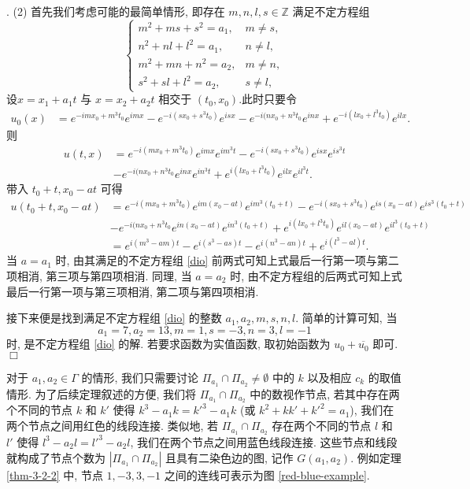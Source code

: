 \documentclass[master]{cugthesis}
\newcommand\Z{\ensuremath{\mathbb{Z}}}
\newenvironment{proof}{{\noindent\itshape 证明}.}{\hfill $\Box$\par}
\begin{document}
\begin{proof}
(2) 首先我们考虑可能的最简单情形, 即存在 $m,n,l,s\in \Z$ 满足不定方程组 
\begin{equation}\label{dio}
    \left\lbrace\begin{array}{ll}
        m^2+ms+s^2=a_1, & m\neq s, \\
        n^2+nl+l^2=a_1, & n\neq l,\\
        m^2+mn+n^2=a_2, & m\neq n,\\
        s^2+sl+l^2=a_2, & s\neq l,
    \end{array}\right.
\end{equation}
 设$x=x_1+a_1 t$ 与 $x=x_2+a_2t$ 相交于 $(t_0,x_0)$.此时只要令
\begin{align*}
    u_0(x) &= e^{-imx_0+m^3t_0}e^{imx}-e^{-i(sx_0+s^3t_0)}e^{isx}-e^{-i(nx_0+n^3t_0}e^{inx}+e^{-i(lx_0+l^3t_0)}e^{ilx}.
\end{align*}
则
\begin{align*}
    u(t,x) &=e^{-i(mx_0+m^3t_0)}e^{imx}e^{im^3t}-e^{-i(sx_0+s^3t_0)}e^{isx}e^{is^3t}\\
    &-e^{-i(nx_0+n^3t_0}e^{inx}e^{in^3t}+e^{i(lx_0+l^3t_0)}e^{ilx}e^{il^3t}.
\end{align*}
带入 $t_0+t,x_0-at$ 可得 
\begin{align*}
    u(t_0+t,x_0-at) &= e^{-i(mx_0+m^3t_0)}e^{im(x_0-at)}e^{im^3(t_0+t)}-e^{-i(sx_0+s^3t_0)}e^{is(x_0-at)}e^{is^3(t_0+t)}\\
    &-e^{-i(nx_0+n^3t_0}e^{in(x_0-at)}e^{in^3(t_0+t)}+e^{i(lx_0+l^3t_0)}e^{il(x_0-at)}e^{il^3(t_0+t)}\\
    &= e^{i(m^3-am)t} -e^{i(s^3-as)t}-e^{i(n^3-an)t}+e^{i(l^3-al)t}.
\end{align*}
当 $a=a_1$ 时, 由其满足的不定方程组 \eqref{dio} 前两式可知上式最后一行第一项与第二项相消, 第三项与第四项相消. 同理, 当 $a=a_2$ 时, 由不定方程组的后两式可知上式最后一行第一项与第三项相消, 第二项与第四项相消.

接下来便是找到满足不定方程组 \eqref{dio} 的整数 $a_1,a_2,m,s,n,l$. 简单的计算可知, 当
\begin{equation*}
    a_1=7,a_2=13,m=1,s=-3,n=3,l=-1
\end{equation*}
时, 是不定方程组 \eqref{dio} 的解. 若要求函数为实值函数, 取初始函数为 $u_0+\overline{u_0}$ 即可.
 \end{proof}
 
 对于 $a_1,a_2\in \Gamma$ 的情形, 我们只需要讨论 $\Pi_{a_1}\cap \Pi_{a_2}\neq \emptyset$ 中的 $k$ 以及相应 $c_k$ 的取值情形. 为了后续定理叙述的方便, 我们将 $\Pi_{a_1}\cap \Pi_{a_2}$ 中的数视作节点, 若其中存在两个不同的节点 $k$ 和 $k'$ 使得 $k^3-a_1k=k'^3-a_1k$ (或 $k^2+kk'+k'^2=a_1$), 我们在两个节点之间用红色的线段连接. 类似地, 若 $\Pi_{a_1}\cap \Pi_{a_2}$ 存在两个不同的节点 $l$ 和 $l'$ 使得 $l^3-a_2l=l'^3-a_2l$, 我们在两个节点之间用蓝色线段连接. 这些节点和线段就构成了节点个数为 $|\Pi_{a_1}\cap \Pi_{a_2}|$ 且具有二染色边的图, 记作 $G(a_1,a_2)$. 例如定理 \ref{thm-3-2-2} 中, 节点 $1,-3,3,-1$ 之间的连线可表示为图 \ref{red-blue-example}.
 
\end{document}
